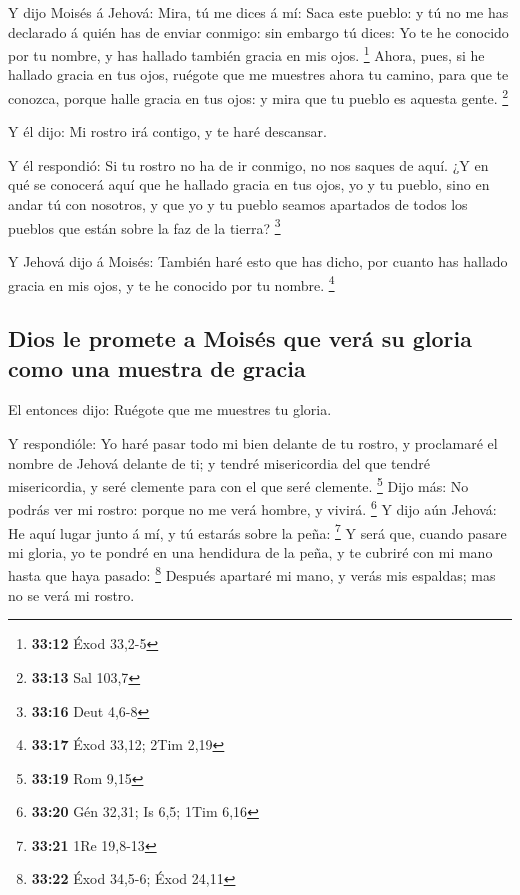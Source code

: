  Y dijo Moisés á Jehová: Mira, tú me dices á mí: Saca
este pueblo: y tú no me has declarado á quién has de enviar conmigo: sin
embargo tú dices: Yo te he conocido por tu nombre, y has hallado también
gracia en mis ojos. \footnote{\textbf{33:12} Éxod 33,2-5}
 Ahora, pues, si he hallado gracia en tus ojos, ruégote
que me muestres ahora tu camino, para que te conozca, porque halle
gracia en tus ojos: y mira que tu pueblo es aquesta gente. \footnote{\textbf{33:13}
  Sal 103,7}

 Y él dijo: Mi rostro irá contigo, y te haré descansar.

 Y él respondió: Si tu rostro no ha de ir conmigo, no nos
saques de aquí.  ¿Y en qué se conocerá aquí que he
hallado gracia en tus ojos, yo y tu pueblo, sino en andar tú con
nosotros, y que yo y tu pueblo seamos apartados de todos los pueblos que
están sobre la faz de la tierra? \footnote{\textbf{33:16} Deut 4,6-8}

 Y Jehová dijo á Moisés: También haré esto que has dicho,
por cuanto has hallado gracia en mis ojos, y te he conocido por tu
nombre. \footnote{\textbf{33:17} Éxod 33,12; 2Tim 2,19}

\hypertarget{dios-le-promete-a-moisuxe9s-que-veruxe1-su-gloria-como-una-muestra-de-gracia}{%
\subsection{Dios le promete a Moisés que verá su gloria como una muestra
de
gracia}\label{dios-le-promete-a-moisuxe9s-que-veruxe1-su-gloria-como-una-muestra-de-gracia}}

 El entonces dijo: Ruégote que me muestres tu gloria.

 Y respondióle: Yo haré pasar todo mi bien delante de tu
rostro, y proclamaré el nombre de Jehová delante de ti; y tendré
misericordia del que tendré misericordia, y seré clemente para con el
que seré clemente. \footnote{\textbf{33:19} Rom 9,15} 
Dijo más: No podrás ver mi rostro: porque no me verá hombre, y vivirá.
\footnote{\textbf{33:20} Gén 32,31; Is 6,5; 1Tim 6,16}  Y
dijo aún Jehová: He aquí lugar junto á mí, y tú estarás sobre la peña:
\footnote{\textbf{33:21} 1Re 19,8-13}  Y será que, cuando
pasare mi gloria, yo te pondré en una hendidura de la peña, y te cubriré
con mi mano hasta que haya pasado: \footnote{\textbf{33:22} Éxod 34,5-6;
  Éxod 24,11}  Después apartaré mi mano, y verás mis
espaldas; mas no se verá mi rostro.

